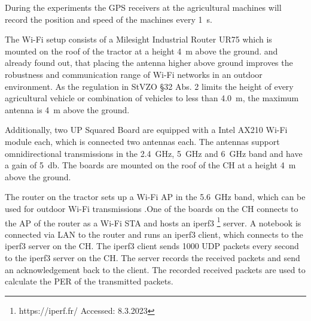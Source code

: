 During the experiments the \ac{GPS} receivers at the agricultural machines will record the position and speed of the machines every \SI{1}{\second}.

The Wi-Fi setup consists of a Milesight Industrial Router UR75 which is mounted on the roof of the tractor at a height \SI{4}{\metre} above the ground.
\textcite{brinkhoff_characterization_2017} and \textcite{paul_characterizing_2011}  already found out, that placing the antenna higher above ground improves
the robustness and communication range of Wi-Fi networks in an outdoor environment. As the regulation in StVZO §32 Abs. 2  limits the height of
every agricultural vehicle or combination of vehicles to less than \SI{4.0}{\metre}, the maximum antenna is \SI{4}{\metre} above the ground.

Additionally, two UP Squared Board are equipped with a Intel AX210 Wi-Fi module each, which is connected two antennas each. The
antennas support omnidirectional transmissions in the \SI{2.4}{\giga\hertz}, \SI{5}{\giga\hertz} and \SI{6}{\giga\hertz} band and have a gain of \SI{5}{\decibel}.
The boards are mounted on the roof of the \ac{CH} at a height \SI{4}{\metre} above the ground.

The router on the tractor sets up a Wi-Fi \ac{AP} in the \SI{5.6}{\giga\hertz} band, which can be used for outdoor Wi-Fi transmissions \cite{freq_plan}.One of the boards on the \ac{CH} connects to the \ac{AP} of the router as a Wi-Fi \ac{STA} and hosts an iperf3 \footnote{https://iperf.fr/ Accessed: 8.3.2023} server.
A notebook is connected via LAN to the router and runs an iperf3 client, which connects to the iperf3 server on the \ac{CH}.
The iperf3 client sends \SI{1000}{\byte} UDP packets every second to the iperf3 server on the \ac{CH}. The server records the received packets and
send an acknowledgement back to the client. The recorded received packets are used to calculate the \ac{PER} of the transmitted packets.

